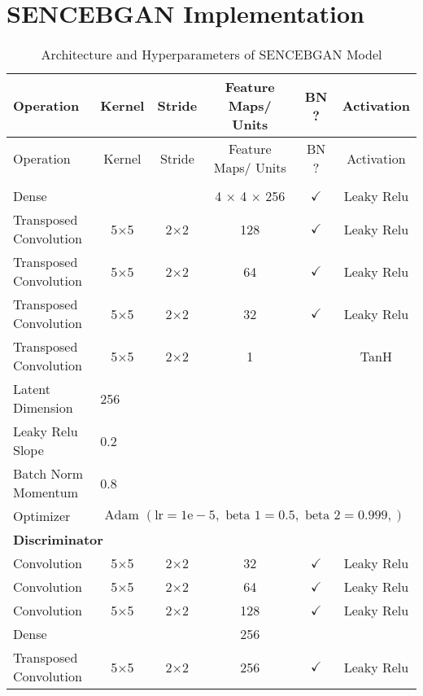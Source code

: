 \section{SENCEBGAN Implementation}
\label{app:sencebgan}
\begin{longtable}[c]{@{}lccccc@{}}
	\caption{Architecture and Hyperparameters of SENCEBGAN Model}
	\label{tab:sencebgan_imp}\\
	\toprule
	Operation & Kernel & Stride & Feature Maps/ Units & BN ? & Activation \\* \midrule
	\endfirsthead
	\toprule
	Operation & Kernel & Stride & Feature Maps/ Units & BN ? & Activation \\* \midrule
	\endhead
	\bottomrule
	\endfoot
	\endlastfoot
		\multicolumn{6}{l}{\textbf{Generator}} \\
	Dense & \multicolumn{1}{c}{} &  & 4 $\times$ 4 $\times$ 256 & $\checkmark$ & Leaky Relu \\
	Transposed Convolution & \multicolumn{1}{c}{5$\times$5} & 2$\times$2 & 128 & $\checkmark$ & Leaky Relu \\
	Transposed Convolution & \multicolumn{1}{c}{5$\times$5} & 2$\times$2 & 64 & $\checkmark$ & Leaky Relu \\
	Transposed Convolution & \multicolumn{1}{c}{5$\times$5} & 2$\times$2 & 32 & $\checkmark$ & Leaky Relu \\
	Transposed Convolution & \multicolumn{1}{c}{5$\times$5} & 2$\times$2 & 1 &  & TanH\\
	Latent Dimension & \multicolumn{5}{l}{256} \\
	Leaky Relu Slope & \multicolumn{5}{l}{0.2} \\
	Batch Norm Momentum & \multicolumn{5}{l}{0.8} \\
	Optimizer & \multicolumn{5}{l}{$\text { Adam }(\mathrm{lr}=1 \mathrm{e}-5, \text { beta } 1=0.5, \text { beta } 2=0.999,)$} \\ \hline
	\multicolumn{6}{l}{\textbf{Discriminator}} \\
	Convolution & \multicolumn{1}{c}{5$\times$5} & 2$\times$2 & 32 & $\checkmark$ & Leaky Relu \\
	Convolution & \multicolumn{1}{c}{5$\times$5} & 2$\times$2 & 64 & $\checkmark$ & Leaky Relu \\
	Convolution & \multicolumn{1}{c}{5$\times$5} & 2$\times$2 & 128 & $\checkmark$ & Leaky Relu \\
	Dense & \multicolumn{1}{c}{} &  & 256 &  &  \\ \hline
	Transposed Convolution & \multicolumn{1}{c}{5$\times$5} & 2$\times$2 & 256 & $\checkmark$ & Leaky Relu \\

\end{longtable}

